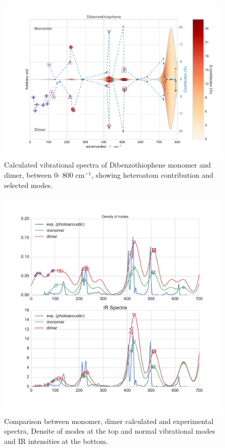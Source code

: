 	
		\begin{figure}[H]
			\begin{center}
				\includegraphics[scale=0.4]{image/P2-14}
			\end{center}
			\caption{Calculated vibrational spectra of Dibenzothiophene monomer and dimer, between 0- 800 cm$^{-1}$, showing heteroatom contribution and selected modes.} \label{figP2-14}
		\end{figure}
		
		
			\begin{figure}[H]
				\begin{center}
					\includegraphics[scale=0.31]{image/P2-15}
				\end{center}
				\caption{Comparison between monomer, dimer calculated and experimental spectra, Densite of modes at the top and normal vibrational modes and IR intensities at the bottom.} \label{figP2-15}
			\end{figure}
	

